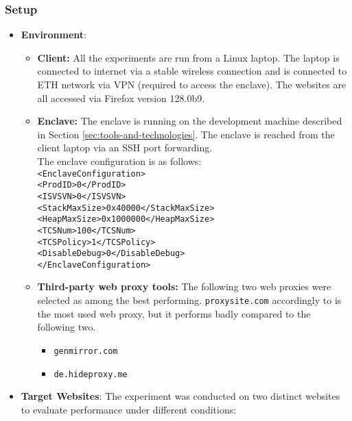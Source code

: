 \subsubsection{Setup}
\begin{itemize}
    \item \textbf{Environment}: 
    \begin{itemize}
        \item \textbf{Client:} All the experiments are run from a Linux laptop. The laptop is connected to internet via a stable wireless connection and is connected to ETH network via VPN (required to access the enclave). The websites are all accessed via Firefox version 128.0b9.
        \item \textbf{Enclave:} The enclave is running on the development machine described in Section \ref{sec:tools-and-technologies}. The enclave is reached from the client laptop via an SSH port forwarding. \\The enclave configuration is as follows:\\
        \texttt{<EnclaveConfiguration>\\
            <ProdID>0</ProdID>\\
            <ISVSVN>0</ISVSVN>\\
            <StackMaxSize>0x40000</StackMaxSize>\\
            <HeapMaxSize>0x1000000</HeapMaxSize>\\
            <TCSNum>100</TCSNum>\\
            <TCSPolicy>1</TCSPolicy>\\
            <DisableDebug>0</DisableDebug>\\
        </EnclaveConfiguration>}
        \item \textbf{Third-party web proxy tools:} The following two web proxies were selected as among the best performing. \texttt{proxysite.com} accordingly to \cite{similar-web} is the most used web proxy, but it performs badly compared to the following two.
        \begin{itemize}
            \item \texttt{genmirror.com}
            \item \texttt{de.hideproxy.me} 
        \end{itemize}
    \end{itemize}
    \item \textbf{Target Websites}: The experiment was conducted on two distinct websites to evaluate performance under different conditions:
    \begin{itemize}

\end{itemize}
\end{itemize}
